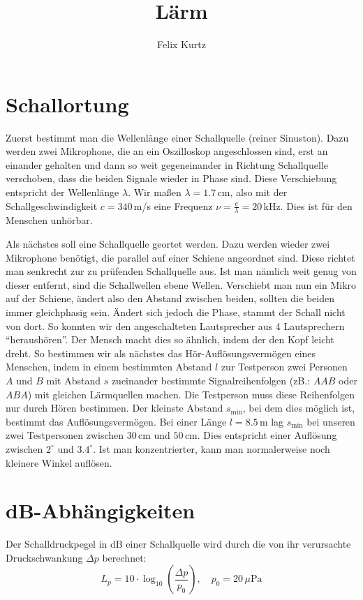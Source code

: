 \documentclass[12pt,a4paper,headinclude,bibtotoc]{scrartcl}
\begin{document}
\title{Lärm}
\author{Felix Kurtz}
\maketitle

\section{Schallortung}
Zuerst bestimmt man die Wellenlänge einer Schallquelle (reiner Sinuston).
Dazu werden zwei Mikrophone, die an ein Oszilloskop angeschlossen sind, erst an einander gehalten und dann so weit gegeneinander in Richtung Schallquelle verschoben, dass die beiden Signale wieder in Phase sind.
Diese Verschiebung entspricht der Wellenlänge $\lambda$.
Wir maßen $\lambda=1.7\,$cm, also mit der Schallgeschwindigkeit $c=340\,$m/s eine Frequenz $\nu = \frac{c}{\lambda}=20\,$kHz.
Dies ist für den Menschen unhörbar.

Als nächstes soll eine Schallquelle geortet werden.
Dazu werden wieder zwei Mikrophone benötigt, die parallel auf einer Schiene angeordnet sind.
Diese richtet man senkrecht zur zu prüfenden Schallquelle aus.
Ist man nämlich weit genug von dieser entfernt, sind die Schallwellen ebene Wellen.
Verschiebt man nun ein Mikro auf der Schiene, ändert also den Abstand zwischen beiden, sollten die beiden immer gleichphasig sein.
Ändert sich jedoch die Phase, stammt der Schall nicht von dort.
So konnten wir den angeschalteten Lautsprecher aus 4 Lautsprechern "`heraushören"'.
Der Mensch macht dies so ähnlich, indem der den Kopf leicht dreht.
So bestimmen wir als nächstes das Hör-Auflösungsvermögen eines Menschen, indem in einem bestimmten  Abstand $l$ zur Testperson zwei Personen $A$ und $B$ mit  Abstand $s$ zueinander bestimmte Signalreihenfolgen (zB.: $AAB$ oder $ABA$) mit gleichen Lärmquellen machen.
Die Testperson muss diese Reihenfolgen nur durch Hören bestimmen.
Der kleinste Abstand $s_\text{min}$, bei dem dies möglich ist, bestimmt das Auflösungsvermögen.
Bei einer Länge $l=8.5\,$m lag $s_\text{min}$ bei unseren zwei Testpersonen zwischen $30\,$cm und $50\,$cm.
Dies entspricht einer Auflösung zwischen $2^\circ$ und $3.4^\circ$.
Ist man konzentrierter, kann man normalerweise noch kleinere Winkel auflösen.

\section{dB-Abhängigkeiten}
Der Schalldruckpegel in dB einer Schallquelle wird durch die von ihr verursachte Druckschwankung $\Delta p$ berechnet:
$$ L_p=10\cdot \log_{10} \left(\frac{\Delta p}{p_0}\right),\quad p_0=20\,\mu \si{\pascal}$$
\end{document}
